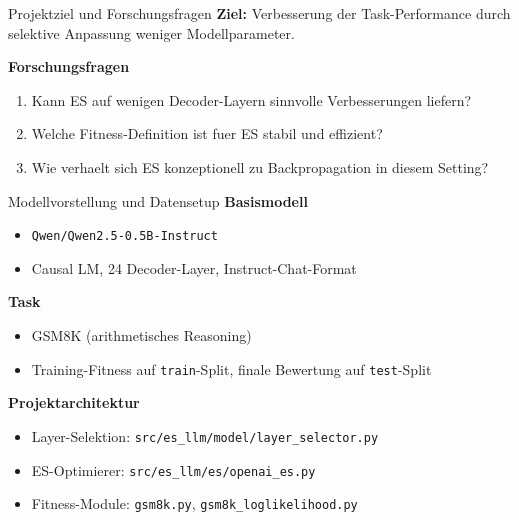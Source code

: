 \documentclass[aspectratio=169,11pt]{beamer}
\begin{document}
\begin{frame}{Projektziel und Forschungsfragen}
\textbf{Ziel:} Verbesserung der Task-Performance durch selektive Anpassung weniger Modellparameter.

\vspace{0.6em}
\textbf{Forschungsfragen}
\begin{enumerate}
  \item Kann ES auf wenigen Decoder-Layern sinnvolle Verbesserungen liefern?
  \item Welche Fitness-Definition ist fuer ES stabil und effizient?
  \item Wie verhaelt sich ES konzeptionell zu Backpropagation in diesem Setting?
\end{enumerate}
\end{frame}

\begin{frame}{Modellvorstellung und Datensetup}
\textbf{Basismodell}
\begin{itemize}
  \item \texttt{Qwen/Qwen2.5-0.5B-Instruct}
  \item Causal LM, 24 Decoder-Layer, Instruct-Chat-Format
\end{itemize}

\textbf{Task}
\begin{itemize}
  \item GSM8K (arithmetisches Reasoning)
  \item Training-Fitness auf \texttt{train}-Split, finale Bewertung auf \texttt{test}-Split
\end{itemize}

\textbf{Projektarchitektur}
\begin{itemize}
  \item Layer-Selektion: \texttt{src/es\_llm/model/layer\_selector.py}
  \item ES-Optimierer: \texttt{src/es\_llm/es/openai\_es.py}
  \item Fitness-Module: \texttt{gsm8k.py}, \texttt{gsm8k\_loglikelihood.py}
\end{itemize}
\end{frame}
\end{document}
